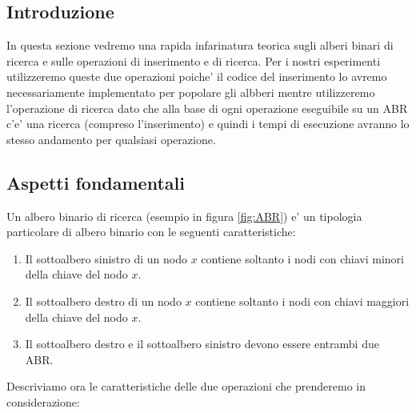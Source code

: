 \subsection{Introduzione}
\label{sec:Introduzione_1}
In questa sezione vedremo una rapida infarinatura teorica sugli alberi binari di ricerca e sulle operazioni di inserimento e di ricerca. Per i nostri esperimenti
utilizzeremo queste due operazioni poiche' il codice del inserimento lo avremo necessariamente implementato per popolare gli albberi mentre utilizzeremo l'operazione
di ricerca dato che alla base di ogni operazione eseguibile su un ABR c'e' una ricerca (compreso l'inserimento) e quindi i tempi di esecuzione avranno lo stesso andamento per qualsiasi operazione. 


\subsection{Aspetti fondamentali}
\label{sec:AspettiFondamentali_1}

Un albero binario di ricerca (esempio in figura \ref{fig:ABR}) e' un tipologia particolare di albero binario con le seguenti caratteristiche:
\begin{enumerate}
    \item Il sottoalbero sinistro di un nodo $x$ contiene soltanto i nodi con chiavi minori della chiave del nodo $x$.
    \item Il sottoalbero destro di un nodo $x$ contiene soltanto i nodi con chiavi maggiori della chiave del nodo $x$.
    \item Il sottoalbero destro e il sottoalbero sinistro devono essere entrambi due ABR.
\end{enumerate}
Descriviamo ora le caratteristiche delle due operazioni che prenderemo in considerazione:

